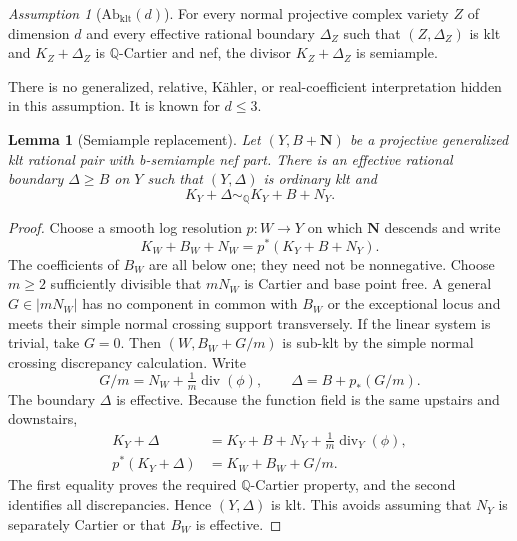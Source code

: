 \documentclass[12pt]{amsart}
\newtheorem{lem}[thm]{Lemma}
\theoremstyle{definition}
\theoremstyle{remark}
\newtheorem{assup}[thm]{Assumption}
\numberwithin{equation}{section}
\newcommand{\Div}{\operatorname{div}}
\newcommand{\Q}{\mathbb{Q}}
\newcommand{\bN}{\mathbf N}
\newcommand{\qs}{\sim_{\mathbb Q}}
\begin{document}
\begin{assup}[$\mathrm{Ab}_{\mathrm{klt}}(d)$]\label{en:Ab}
For every normal projective complex variety $Z$ of dimension $d$ and every effective rational boundary $\Delta_Z$ such that $(Z,\Delta_Z)$ is klt and $K_Z+\Delta_Z$ is $\Q$-Cartier and nef, the divisor $K_Z+\Delta_Z$ is semiample.
\end{assup}
There is no generalized, relative, K\"ahler, or real-coefficient interpretation hidden in this assumption. It is known for $d\leq3$.

\begin{lem}[Semiample replacement]\label{en:replacement}
Let $(Y,B+\bN)$ be a projective generalized klt rational pair with b-semiample nef part. There is an effective rational boundary $\Delta\geq B$ on $Y$ such that $(Y,\Delta)$ is ordinary klt and
\[
 K_Y+\Delta\qs K_Y+B+N_Y.
\]
\end{lem}
\begin{proof}
Choose a smooth log resolution $p:W\to Y$ on which $\bN$ descends and write
\[
 K_W+B_W+N_W=p^*(K_Y+B+N_Y).
\]
The coefficients of $B_W$ are all below one; they need not be nonnegative. Choose $m\geq2$ sufficiently divisible that $mN_W$ is Cartier and base point free. A general $G\in|mN_W|$ has no component in common with $B_W$ or the exceptional locus and meets their simple normal crossing support transversely. If the linear system is trivial, take $G=0$. Then $(W,B_W+G/m)$ is sub-klt by the simple normal crossing discrepancy calculation. Write
\[
 G/m=N_W+\tfrac1m\Div(\phi),\qquad
 \Delta=B+p_*(G/m).
\]
The boundary $\Delta$ is effective. Because the function field is the same upstairs and downstairs,
\begin{align*}
 K_Y+\Delta
 &=K_Y+B+N_Y+\tfrac1m\Div_Y(\phi),\\
 p^*(K_Y+\Delta)
 &=K_W+B_W+G/m.
\end{align*}
The first equality proves the required $\Q$-Cartier property, and the second identifies all discrepancies. Hence $(Y,\Delta)$ is klt. This avoids assuming that $N_Y$ is separately Cartier or that $B_W$ is effective.
\end{proof}
\end{document}
